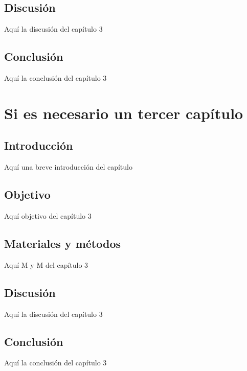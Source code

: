 \documentclass[12pt,oneside]{reedthesis}
\begin{document}
\section{Discusión}\label{discusiuxf3n-1}

Aquí la discusión del capítulo 3

\section{Conclusión}\label{conclusiuxf3n-1}

Aquí la conclusión del capítulo 3\\

\hfill\break

\chapter{Si es necesario un tercer capítulo}\label{ref-labels}

\section{Introducción}\label{introducciuxf3n-3}

Aquí una breve introducción del capítulo

\section{Objetivo}\label{objetivo-1}

Aquí objetivo del capítulo 3

\section{Materiales y métodos}\label{materiales-y-muxe9todos-2}

Aquí M y M del capítulo 3

\section{Discusión}\label{discusiuxf3n-2}

Aquí la discusión del capítulo 3

\section{Conclusión}\label{conclusiuxf3n-2}

Aquí la conclusión del capítulo 3\\
\end{document}
